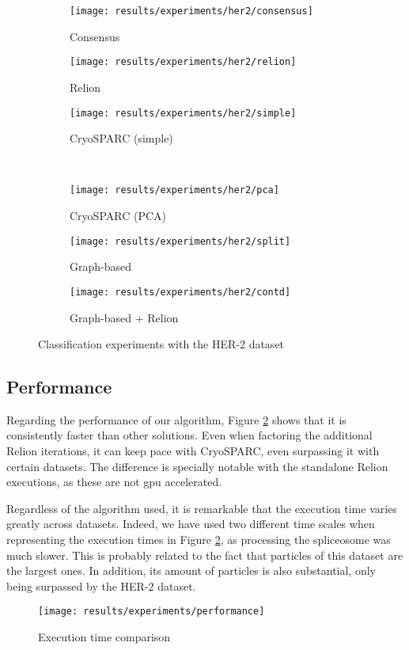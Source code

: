 \documentclass[../main.tex]{subfiles}
\begin{document}
\begin{figure}[hbp]
    \centering
    \begin{subfigure}[b]{0.3\textwidth}
         \centering
         \texttt{[image: results/experiments/her2/consensus]}
         \caption{Consensus}
    \end{subfigure}
    \begin{subfigure}[b]{0.3\textwidth}
         \centering
         \texttt{[image: results/experiments/her2/relion]}
         \caption{Relion}
    \end{subfigure}
    \begin{subfigure}[b]{0.3\textwidth}
         \centering
         \texttt{[image: results/experiments/her2/simple]}
         \caption{CryoSPARC (simple)}
    \end{subfigure}\\
    \vspace{1em}
    \begin{subfigure}[b]{0.3\textwidth}
         \centering
         \texttt{[image: results/experiments/her2/pca]}
         \caption{CryoSPARC (PCA)}
    \end{subfigure}
    \begin{subfigure}[b]{0.3\textwidth}
         \centering
         \texttt{[image: results/experiments/her2/split]}
         \caption{Graph-based}
    \end{subfigure}
    \begin{subfigure}[b]{0.3\textwidth}
         \centering
         \texttt{[image: results/experiments/her2/contd]}
         \caption{Graph-based + Relion}
    \end{subfigure}
    \caption{Classification experiments with the HER-2 dataset}
    \label{fig:5.2:her2_slices}
\end{figure}

\subsection{Performance}
Regarding the performance of our algorithm, Figure \ref{fig:5.2:performance} shows that it is consistently faster than other solutions. Even when factoring the additional Relion iterations, it can keep pace with CryoSPARC, even surpassing it with certain datasets. The difference is specially notable with the standalone Relion executions, as these are not \gls{gpu} accelerated.

Regardless of the algorithm used, it is remarkable that the execution time varies greatly across datasets. Indeed, we have used two different time scales when representing the execution times in Figure \ref{fig:5.2:performance}, as processing the spliceosome was much slower. This is probably related to the fact that particles of this dataset are the largest ones. In addition, its amount of particles is also substantial, only being surpassed by the HER-2 dataset.

\begin{figure}
    \centering
    \texttt{[image: results/experiments/performance]}
    \caption{Execution time comparison}
    \label{fig:5.2:performance}
\end{figure}
\end{document}
